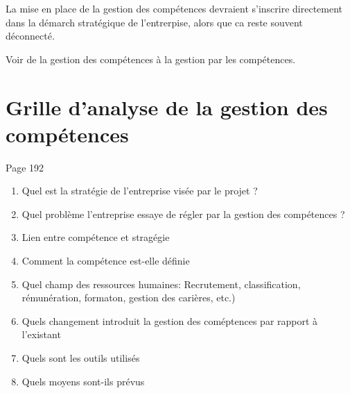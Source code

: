 La mise en place de la gestion des compétences devraient s'inscrire directement dans la démarch stratégique de l'entrerpise, alors que ca reste souvent déconnecté. 

Voir de la gestion des compétences à la gestion par les compétences. 


\section{Grille d'analyse de la gestion des compétences}

Page 192
\begin{enumerate}
    \item Quel est la stratégie de l'entreprise visée par le projet ?
    \item Quel problème l'entreprise essaye de régler par la gestion des compétences ?
    \item Lien entre compétence et stragégie 
    \item Comment la compétence est-elle définie
    \item Quel champ des ressources humaines: Recrutement, classification, rémunération, formaton, gestion des carières, etc.)
    \item Quels changement introduit la gestion des coméptences par rapport à l'existant
    \item Quels sont les outils utilisés
    \item Quels moyens sont-ils prévus  
\end{enumerate}
